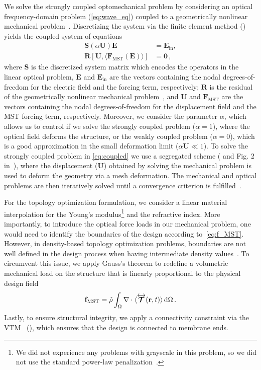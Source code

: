 We solve the strongly coupled optomechanical problem by considering an optical frequency-domain problem (\eqref{eq:wave_eq}) coupled to a geometrically nonlinear mechanical problem~\cite{ownpub5,cook_concepts_2001}. Discretizing the system via the finite element
method () yields the coupled system of equations
\begin{equation}\label{eq:coupled}
    \begin{aligned}
 \mathbf{S}\left(\alpha\mathbf{U}\right) \mathbf{E} &= \mathbf{E}_\text{in} , \\
 \mathbf{R}[\mathbf{U}, \langle \mathbf{F}_\text{MST}(\mathbf{E})\rangle] &=\mathbf{0}\,,
    \end{aligned}
    \end{equation}
where $\mathbf{S}$ is the discretized system matrix which encodes the operators
 in the linear optical problem, $\mathbf{E}$ and 
 $\mathbf{E}_\text{in}$ are the vectors containing the nodal degrees-of-freedom for the electric 
field and the forcing term, respectively; $\mathbf{R}$ is the residual of the
 geometrically nonlinear mechanical problem~\cite{cook_concepts_2001}, and 
 $\mathbf{U}$ and $\mathbf{F}_\text{MST}$ are the vectors containing the nodal
 degrees-of-freedom for the displacement field and the MST forcing term, respectively. 
 Moreover, we consider the parameter $\alpha$, which allows us to control if we solve 
 the strongly coupled problem ($\alpha=1$), where the optical field deforms the structure, 
 or the weakly coupled problem ($\alpha=0$), which is a good approximation in the small deformation 
 limit ($\alpha\mathbf{U} \ll 1$). To solve the strongly coupled problem in 
  \eqref{eq:coupled} we use a segregated scheme ( and Fig. 2 in~\cite{ownpub5}), where the displacement ($\mathbf{U}$) obtained
 by solving the mechanical problem is used to deform the geometry via a mesh deformation. The mechanical and
 optical problems are then iteratively solved until a convergence criterion is fulfilled~\cite {ownpub5}.

 For the topology optimization formulation, we consider a linear material interpolation for the Young's modulus\footnote{We did not experience any problems with grayscale in this problem, so we did not use the standard power-law penalization~\cite{SIMP}.} and the 
 refractive index. More importantly, to introduce the optical force loads in our mechanical problem, one would need to identify the boundaries of the design according to~\eqref{eq:f_MST}. However, in density-based topology optimization problems, boundaries
 are not well defined in the design process when having intermediate density values~\cite{jdara}. To circumvent this issue, we apply Gauss's theorem to
 redefine a volumetric mechanical load on the structure that is linearly proportional to the physical design field
    \begin{equation}
 \mathbf{f}_\text{MST} = \hat{\rho} \int_{\Omega} \nabla \cdot \langle\overleftrightarrow{\bm{\mathcal{T}}}(\mathbf{r}, t)\rangle \mathop{}\!\text{d} \Omega\,.
    \end{equation}
 Lastly, to ensure structural integrity, we apply a connectivity constraint via the VTM~\cite{li_structural_2016} (), which ensures that the design is connected to membrane ends. 


